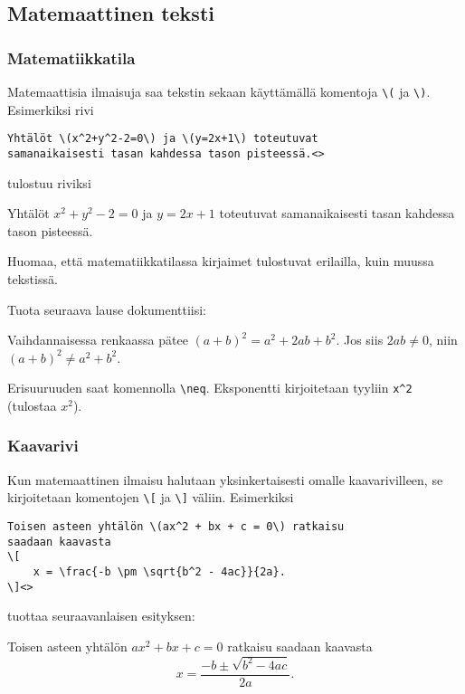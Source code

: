 \subsection{Matemaattinen teksti}
\begin{fframe}
    \frametitle{Matematiikkatila}
    Matemaattisia ilmaisuja saa tekstin sekaan käyttämällä komentoja \lstinline+\(+  
    ja \lstinline+\)+. \pause Esimerkiksi rivi
    \begin{lstlisting}
Yhtälöt \(x^2+y^2-2=0\) ja \(y=2x+1\) toteutuvat 
samanaikaisesti tasan kahdessa tason pisteessä.<>
    \end{lstlisting}
    \pause
    tulostuu riviksi 
    \begin{sample}
        Yhtälöt \(x^2+y^2-2=0\) ja \(y=2x+1\) toteutuvat samanaikaisesti tasan kahdessa tason pisteessä.
    \end{sample} 
    \pause
    Huomaa, että matematiikkatilassa kirjaimet tulostuvat erilailla, kuin muussa tekstissä. 
\end{fframe}

\begin{fframe}
    \begin{harj}
        Tuota seuraava lause dokumenttiisi:
        \begin{sample}
            Vaihdannaisessa renkaassa pätee \((a+b)^2=a^2+2ab+b^2\). Jos siis \(2ab\neq0\), niin \((a+b)^2\neq a^2+b^2\). 
        \end{sample}
        Erisuuruuden saat komennolla \lstinline-\neq-. Eksponentti kirjoitetaan tyyliin \lstinline-x^2- (tulostaa \(x^2\)).
    \end{harj}
\end{fframe}

\begin{fframe}
    \frametitle{Kaavarivi}
    Kun matemaattinen ilmaisu halutaan yksinkertaisesti omalle kaavarivilleen, se kirjoitetaan komentojen \lstinline-\[- ja \lstinline-\]- väliin.
    \pause
    Esimerkiksi 
    \begin{lstlisting}
Toisen asteen yhtälön \(ax^2 + bx + c = 0\) ratkaisu
saadaan kaavasta
\[
    x = \frac{-b \pm \sqrt{b^2 - 4ac}}{2a}.
\]<>
    \end{lstlisting}
    tuottaa seuraavanlaisen esityksen:
    \pause
    \begin{sample}
        Toisen asteen yhtälön \(ax^2 + bx + c = 0\)
        ratkaisu saadaan kaavasta
        \[
            x = \frac{-b \pm \sqrt{b^2 - 4ac}}{2a}.
        \]
    \end{sample}
\end{fframe}

